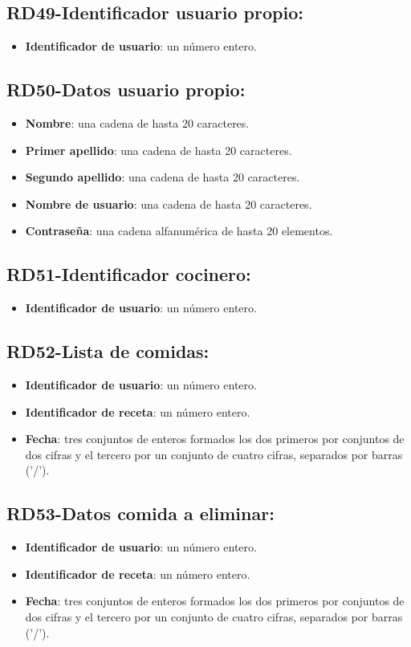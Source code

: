 \documentclass[a4paper,12pt]{report}
\begin{document}
\subsection{RD49-Identificador usuario propio:}
\label{sec-2-1-49}
\begin{itemize}
\item \textbf{Identificador de usuario}: un número entero.
\end{itemize}
\subsection{RD50-Datos usuario propio:}
\label{sec-2-1-50}
\begin{itemize}
\item \textbf{Nombre}: una cadena de hasta 20 caracteres.
\item \textbf{Primer apellido}: una cadena de hasta 20 caracteres.
\item \textbf{Segundo apellido}: una cadena de hasta 20 caracteres.
\item \textbf{Nombre de usuario}: una cadena de hasta 20 caracteres.
\item \textbf{Contraseña}: una cadena alfanumérica de hasta 20 elementos.
\end{itemize}
\subsection{RD51-Identificador cocinero:}
\label{sec-2-1-51}
\begin{itemize}
\item \textbf{Identificador de usuario}: un número entero.
\end{itemize}
\subsection{RD52-Lista de comidas:}
\label{sec-2-1-52}
\begin{itemize}
\item \textbf{Identificador de usuario}: un número entero.
\item \textbf{Identificador de receta}: un número entero.
\item \textbf{Fecha}: tres conjuntos de enteros formados los dos primeros por
conjuntos de dos cifras y el tercero por un conjunto de cuatro
cifras, separados por barras ('/').
\end{itemize}
\subsection{RD53-Datos comida a eliminar:}
\label{sec-2-1-53}
\begin{itemize}
\item \textbf{Identificador de usuario}: un número entero.
\item \textbf{Identificador de receta}: un número entero.
\item \textbf{Fecha}: tres conjuntos de enteros formados los dos primeros por
conjuntos de dos cifras y el tercero por un conjunto de cuatro
cifras, separados por barras ('/').
\end{itemize}
\end{document}
